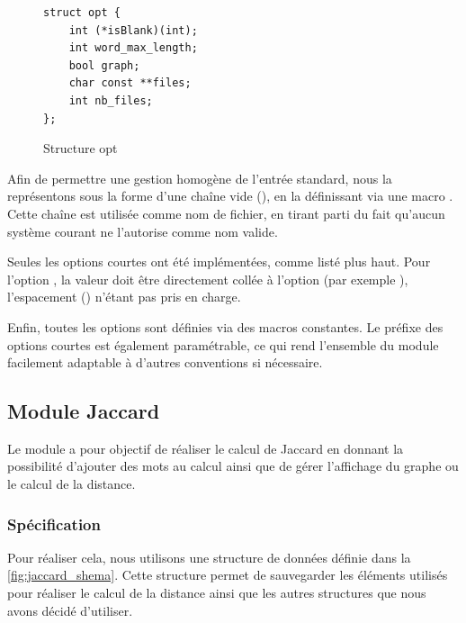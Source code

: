 \documentclass[a4paper, 12pt]{article}
\newcommand{\code}{\commandbox}
\begin{document}
\begin{figure}[h]
\centering
\begin{tcolorbox}[center upper,
enhanced,
colback=darkWhite,
boxrule=0pt,
frame hidden,
width=0.5\textwidth]
\begin{lstlisting}[style=bigCode]
struct opt {
    int (*isBlank)(int);
    int word_max_length;
    bool graph;
    char const **files;
    int nb_files;
};
\end{lstlisting}
\end{tcolorbox}
\caption{Structure opt}
\label{fig:structure_opt}
\end{figure}

Afin de permettre une gestion homogène de l'entrée standard, nous la représentons sous la forme d'une chaîne vide (\code{""}), en la définissant via une macro \code{STDIN}. Cette chaîne est utilisée comme nom de fichier, en tirant parti du fait qu'aucun système courant ne l'autorise comme nom valide.

Seules les options courtes ont été implémentées, comme listé plus haut. Pour l'option \code{-iVALUE}, la valeur doit être directement collée à l'option (par exemple \code{-i3}), l'espacement (\code{-i 3}) n'étant pas pris en charge.

Enfin, toutes les options sont définies via des macros constantes. Le préfixe des options courtes est également paramétrable, ce qui rend l'ensemble du module facilement adaptable à d'autres conventions si nécessaire.


\subsection{Module Jaccard}

Le module \code{jaccard} a pour objectif de réaliser le calcul de Jaccard en donnant la possibilité d'ajouter des mots au calcul ainsi que de gérer l'affichage du graphe ou le calcul de la distance.

\subsubsection{Spécification}

Pour réaliser cela, nous utilisons une structure de données définie dans la \autoref{fig:jaccard_shema}. Cette structure permet de sauvegarder les éléments utilisés pour réaliser le calcul de la distance ainsi que les autres structures que nous avons décidé d'utiliser. 
\end{document}
